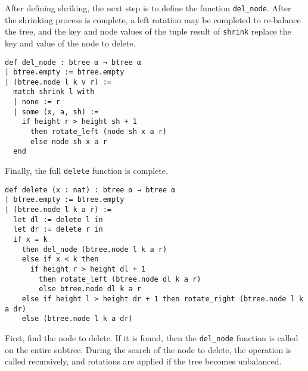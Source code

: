 After defining shriking, the next step is to define the function \lstinline{del_node}. After the shrinking process is complete, a left rotation may be completed to re-balance the tree, and the key and node values of the tuple result of \lstinline{shrink} replace the key and value of the node to delete.

\begin{lstlisting}
def del_node : btree α → btree α
| btree.empty := btree.empty
| (btree.node l k v r) :=
  match shrink l with 
  | none := r
  | some (x, a, sh) :=
    if height r > height sh + 1 
      then rotate_left (node sh x a r)
      else node sh x a r
  end
\end{lstlisting}

Finally, the full \lstinline{delete} function is complete. 

\begin{lstlisting}
def delete (x : nat) : btree α → btree α
| btree.empty := btree.empty
| (btree.node l k a r) :=
  let dl := delete l in
  let dr := delete r in
  if x = k 
    then del_node (btree.node l k a r)
    else if x < k then
      if height r > height dl + 1 
        then rotate_left (btree.node dl k a r)
        else btree.node dl k a r
    else if height l > height dr + 1 then rotate_right (btree.node l k a dr)
    else (btree.node l k a dr)
\end{lstlisting}

First, find the node to delete. If it is found, then the \lstinline{del_node} function is called on the entire subtree. During the search of the node to delete, the operation is called recursively, and rotations are applied if the tree becomes unbalanced. 